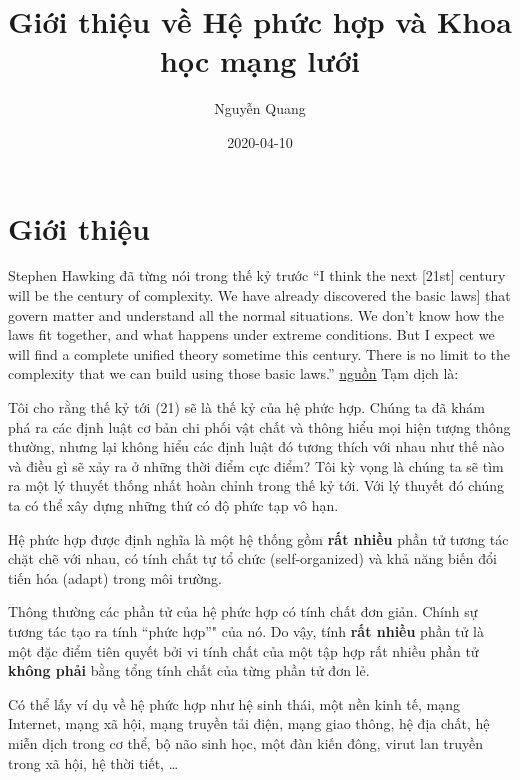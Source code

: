 \documentclass[]{book}
\title{Giới thiệu về Hệ phức hợp và Khoa học mạng lưới}
\author{Nguyễn Quang}
\date{2020-04-10}
\begin{document}
\maketitle

{
\setcounter{tocdepth}{1}
\tableofcontents
}
\chapter{Giới thiệu}\label{intro}

Stephen Hawking đã từng nói trong thế kỷ trước ``I think the next
{[}21st{]} century will be the century of complexity. We have already
discovered the basic laws{]} that govern matter and understand all the
normal situations. We don't know how the laws fit together, and what
happens under extreme conditions. But I expect we will find a complete
unified theory sometime this century. There is no limit to the
complexity that we can build using those basic laws.''
\href{https://en.wikiquote.org/wiki/Complexity}{nguồn} Tạm dịch là:

Tôi cho rằng thế kỷ tới (21) sẽ là thế kỷ của hệ phức hợp. Chúng ta đã
khám phá ra các định luật cơ bản chi phối vật chất và thông hiểu mọi
hiện tượng thông thường, nhưng lại không hiểu các định luật đó tương
thích với nhau như thế nào và điều gì sẽ xảy ra ở những thời điểm cực
điểm? Tôi kỳ vọng là chúng ta sẽ tìm ra một lý thuyết thống nhất hoàn
chỉnh trong thế kỷ tới. Với lý thuyết đó chúng ta có thể xây dựng những
thứ có độ phức tạp vô hạn.

Hệ phức hợp được định nghĩa là một hệ thống gồm \textbf{rất nhiều} phần
tử tương tác chặt chẽ với nhau, có tính chất tự tổ chức (self-organized)
và khả năng biến đổi tiến hóa (adapt) trong môi trường.

Thông thường các phần tử của hệ phức hợp có tính chất đơn giản. Chính sự
tương tác tạo ra tính ``phức hợp''" của nó. Do vậy, tính \textbf{rất
nhiều} phần tử là một đặc điểm tiên quyết bởi vi tính chất của một tập
hợp rất nhiều phần tử \textbf{không phải} bằng tổng tính chất của từng
phần tử đơn lẻ.

Có thể lấy ví dụ về hệ phức hợp như hệ sinh thái, một nền kinh tế, mạng
Internet, mạng xã hội, mạng truyền tải điện, mạng giao thông, hệ địa
chất, hệ miễn dịch trong cơ thể, bộ não sinh học, một đàn kiến đông,
virut lan truyền trong xã hội, hệ thời tiết, \ldots{}
\end{document}
